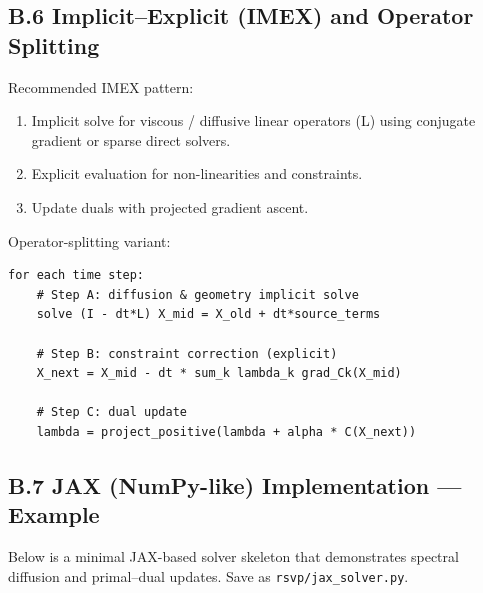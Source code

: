 \documentclass[11pt,a4paper]{article}
\begin{document}
\subsection{B.6 Implicit–Explicit (IMEX) and Operator Splitting}

Recommended IMEX pattern:

\begin{enumerate}
  \item Implicit solve for viscous / diffusive linear operators (L) using conjugate gradient or sparse direct solvers.
  \item Explicit evaluation for non-linearities and constraints.
  \item Update duals with projected gradient ascent.
\end{enumerate}

Operator-splitting variant:

\begin{verbatim}
for each time step:
    # Step A: diffusion & geometry implicit solve
    solve (I - dt*L) X_mid = X_old + dt*source_terms

    # Step B: constraint correction (explicit)
    X_next = X_mid - dt * sum_k lambda_k grad_Ck(X_mid)

    # Step C: dual update
    lambda = project_positive(lambda + alpha * C(X_next))
\end{verbatim}

\subsection{B.7 JAX (NumPy-like) Implementation — Example}

Below is a minimal JAX-based solver skeleton that demonstrates spectral diffusion and primal–dual updates. Save as \texttt{rsvp/jax\_solver.py}.
\end{document}
